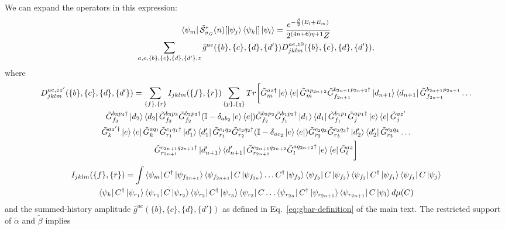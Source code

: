 \documentclass[aps,floatfix,10pt,amssymb,amsfont,amsmath,superscriptaddress,float,nofootinbib,longbibliography,nobalancelastpage,twocolumn]{revtex4-2}
\begin{document}
We can expand the operators in this expression:
\begin{multline}
    \bra{\psi_m}\tilde{\mathcal{S}}^*_{\sigma_G}(n)[\ket{\psi_j}\bra{\psi_k}]\ket{\psi_l} = \frac{e^{-\frac{\beta}{2}(E_l+E_m)}}{2^{(4n+6)\eta+1}Z}\\\sum_{a,e,\{b\},\{c\},\{d\},\{d'\},z} \bar g^{ae}(\{b\},\{c\},\{d\},\{d'\}) D^{ae,z0}_{jklm}(\{b\},\{c\},\{d\},\{d'\}),
    \label{eq:B*def}
\end{multline}
where 
\begin{multline}
    D^{ae,zz'}_{jklm}(\{b\},\{c\},\{d\},\{d'\}) =  \sum_{\{f\}, \{r\}}  I_{jklm}(\{f\},\{r\})
    \sum_{\{p\},\{q\}}
Tr\bigg[\tilde G^{az\dagger}_m\ket{e}\bra{e}\tilde G^{ap_{2n+2}}_m\tilde G^{b_{2n+1}p_{2n+2}\dagger}_{f_{2n+1}}\ket{d_{n+1}}\bra{d_{n+1}}\tilde G^{b_{2n+1}p_{2n+1}}_{f_{2n+1}}\ldots\\ \tilde G^{b_3p_4\dagger}_{f_3}\ket{d_2}\bra{d_2}\tilde G^{b_3p_3}_{f_3}\tilde G^{b_2p_3\dagger}_{f_2}(\mathbb{I} - \delta_{ab_2}\ket{e}\bra{e})\tilde G^{b_2p_2}_{f_2}\tilde G^{b_1p_2\dagger}_{f_1}\ket{d_1}\bra{d_1}\tilde G^{b_1p_1}_{f_1}\tilde G^{ap_1\dagger}_j\ket{e}\bra{e}\tilde G^{az'}_j\\
\tilde G^{az'\dagger}_k\ket{e}\bra{e}\tilde G^{aq_1}_k\tilde G^{c_1q_1\dagger}_{r_1}\ket{d'_1}\bra{d'_1}\tilde G^{c_1q_2}_{r_1}\tilde G^{c_2q_2\dagger}_{r_2}(\mathbb{I} - \delta_{ac_2}\ket{e}\bra{e})\tilde G^{c_2q_3}_{r_2}\tilde G^{c_3q_3\dagger}_{r_3}\ket{d'_2}\bra{d'_2}\tilde G^{c_3q_4}_{r_3}\ldots\\
\tilde G^{c_{2n+1}q_{2n+1}\dagger}_{r_{2n+1}}\ket{d'_{n+1}}\bra{d'_{n+1}}\tilde G^{c_{2n+1}q_{2n+2}}_{r_{2n+1}}\tilde G^{aq_{2n+2}\dagger}_l\ket{e}\bra{e}\tilde G^{az}_l \bigg]
\end{multline}
\begin{multline}
I_{jklm}(\{f\},\{r\})=\int\bra{\psi_{m}}C^{\dagger}\ket{\psi_{f_{2n+1}}}\bra{\psi_{f_{2n+1}}}C\ket{\psi_{f_{2n}}}\ldots C^{\dagger}\ket{\psi_{f_3}}\bra{\psi_{f_3}}C\ket{\psi_{f_2}}\bra{\psi_{f_2}}C^{\dagger}\ket{\psi_{f_1}}\bra{\psi_{f_1}}C\ket{\psi_j}
\\\bra{\psi_k}C^{\dagger}\ket{\psi_{r_1}}\bra{\psi_{r_1}}C\ket{\psi_{r_2}}\bra{\psi_{r_2}}C^{\dagger}\ket{\psi_{r_3}}\bra{\psi_{r_3}}C\ldots \bra{\psi_{r_{2n}}}C^{\dagger}\ket{\psi_{r_{2n+1}}}\bra{\psi_{r_{2n+1}}}C\ket{\psi_{l}}d\mu(C)
\end{multline}
and
the summed-history amplitude $\bar g^{ae}(\{b\},\{c\},\{d\},\{d'\})$ as defined in Eq.~\eqref{eq:gbar-definition} of the main text.
The restricted support of $\tilde\alpha$ and $\tilde\beta$ implies
\end{document}
